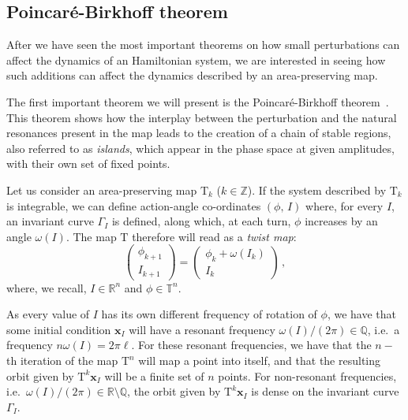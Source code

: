 \subsection{Poincaré-Birkhoff theorem}

After we have seen the most important theorems on how small perturbations can affect the dynamics of an Hamiltonian system, we are interested in seeing how such additions can affect the dynamics described by an area-preserving map.

The first important theorem we will present is the Poincaré-Birkhoff theorem~\cite{poincare, birkhoff}. This theorem shows how the interplay between the perturbation and the natural resonances present in the map leads to the creation of a chain of stable regions, also referred to as \textit{islands}, which appear in the phase space at given amplitudes, with their own set of fixed points.

Let us consider an area-preserving map $\mathrm{T}_k$ ($k\in\mathbb{Z}$). If the system described by $\mathrm{T}_k$ is integrable, we can define action-angle co-ordinates $(\phi,\,I)$ where, for every $I$, an invariant curve $\Gamma_I$ is defined, along which, at each turn, $\phi$ increases by an angle $\omega(I)$. The map $\mathrm{T}$ therefore will read as a \textit{twist map}:
%
\begin{equation}
	\begin{pmatrix} \phi_{k+1} \\ I_{k+1} \end{pmatrix}  = \begin{pmatrix} \phi_k + \omega(I_k) \\ I_k \end{pmatrix} \, ,
\end{equation}
%
where, we recall, $I \in \mathbb{R}^n$ and $\phi \in \mathbb{T}^n$.

As every value of $I$ has its own different frequency of rotation of $\phi$, we have that some initial condition $\mathbf{x}_I$ will have a resonant frequency $\omega(I)/(2\pi)\in \mathbb{Q}$, i.e.\ a frequency $n\omega(I)=2\pi \ell$. For these resonant frequencies, we have that the $n-$th iteration of the map $\mathrm{T}^n$ will map a point into itself, and that the resulting orbit given by $\mathrm{T}^k \mathbf{x}_I$ will be a finite set of $n$ points. For non-resonant frequencies, i.e.\ $\omega(I)/(2\pi) \in \mathbb{R}\setminus \mathbb{Q}$, the orbit given by $\mathrm{T}^k \mathbf{x}_I$ is dense on the invariant curve $\Gamma_I$.

